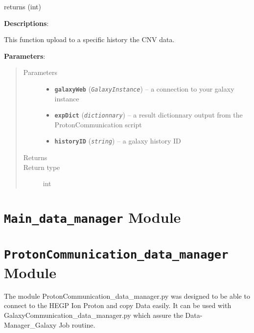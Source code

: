 \documentclass[letterpaper,10pt,english]{sphinxmanual}
\begin{document}
\begin{fulllineitems}
\label{datamanagerpkg:datamanagerpkg.GalaxyCommunication_data_manager.upload_To_History_CNV}
returns (int)

\textbf{Descriptions}:

This function upload to a specific history the CNV data.

\textbf{Parameters}:
\begin{quote}\begin{description}
\item[{Parameters}] \leavevmode\begin{itemize}
\item {} 
\textbf{\texttt{galaxyWeb}} (\emph{\texttt{GalaxyInstance}}) -- a connection to your galaxy instance

\item {} 
\textbf{\texttt{expDict}} (\emph{\texttt{dictionnary}}) -- a result dictionnary output from the ProtonCommunication script

\item {} 
\textbf{\texttt{historyID}} (\emph{\texttt{string}}) -- a galaxy history ID

\end{itemize}

\item[{Returns}] 

\item[{Return type}] \leavevmode
int

\end{description}\end{quote}

\end{fulllineitems}



\section{\texttt{Main\_data\_manager} Module}
\label{datamanagerpkg:module-datamanagerpkg.Main_data_manager}\label{datamanagerpkg:main-data-manager-module}

\section{\texttt{ProtonCommunication\_data\_manager} Module}
\label{datamanagerpkg:protoncommunication-data-manager-module}\label{datamanagerpkg:module-datamanagerpkg.ProtonCommunication_data_manager}
The module ProtonCommunication\_data\_manager.py was
designed to be able to connect to the HEGP Ion Proton and
copy Data easily. It can be used with GalaxyCommunication\_data\_manager.py which
assure the Data-Manager\_Galaxy Job routine.
\end{document}
